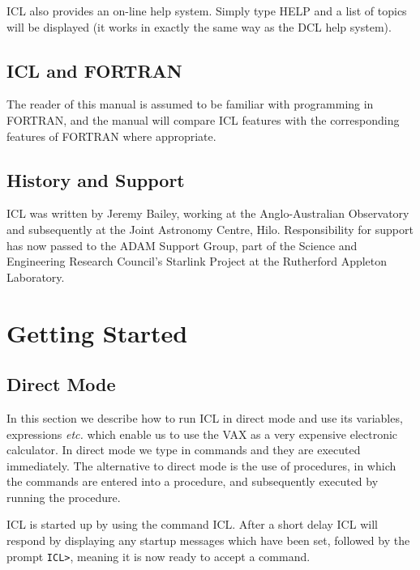 \documentclass[twoside,11pt,nolof,chapters]{starlink}
\begin{document}
ICL also provides an on-line help system. Simply type HELP and a
list of topics will be displayed (it works in exactly the same way as
the DCL help system).

\section{ICL and FORTRAN}
The reader of this manual is assumed to be familiar with programming in
FORTRAN, and the manual will compare ICL features with the corresponding
features of FORTRAN where appropriate.

\section{History and Support}
ICL was written by Jeremy Bailey, working at the Anglo-Australian Observatory
and subsequently at the Joint Astronomy Centre, Hilo.
Responsibility for support has now passed to the ADAM Support Group, part of
the Science and Engineering Research Council's Starlink Project at the
Rutherford Appleton Laboratory.

\chapter{Getting Started}
\section{Direct Mode}
In this section we describe how to run ICL in direct mode and use its
variables, expressions \emph{etc.} which enable us to use the VAX as a very
expensive electronic calculator. In direct mode we type in commands
and they are executed immediately. The alternative to direct mode is the
use of procedures, in which the commands are entered into a procedure,
and subsequently executed by running the procedure.

ICL is started up by using the command ICL. After a short delay ICL will
respond by displaying any startup messages which have been set, followed by
the prompt \verb+ICL>+, meaning it is now ready to accept a command.
\end{document}
